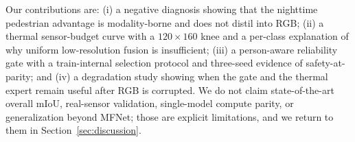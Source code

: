 Our contributions are: (i) a negative diagnosis showing that the nighttime pedestrian
advantage is modality-borne and does not distil into RGB; (ii) a thermal sensor-budget
curve with a $120\times160$ knee and a per-class explanation of why uniform
low-resolution fusion is insufficient; (iii) a person-aware reliability gate with a
train-internal selection protocol and three-seed evidence of safety-at-parity; and
(iv) a degradation study showing when the gate and the thermal expert remain useful
after RGB is corrupted. We do not claim state-of-the-art overall mIoU, real-sensor
validation, single-model compute parity, or generalization beyond MFNet; those are
explicit limitations, and we return to them in Section~\ref{sec:discussion}.
